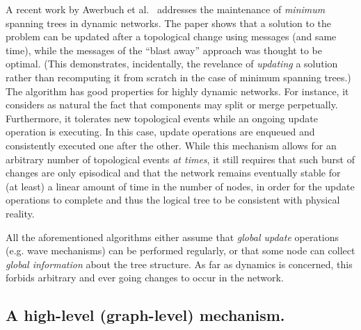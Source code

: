 \documentclass[twocolumn]{article}
\begin{document}
A recent work by Awerbuch et al.~\cite{Awerbuch08} addresses the maintenance of {\em minimum} spanning trees in dynamic networks. The paper shows that a solution to the problem can be updated after a topological change using  messages (and same time), while the  messages of the ``blast away'' approach was thought to be optimal. (This demonstrates, incidentally, the revelance of {\em updating} a solution rather than recomputing it from scratch in the case of minimum spanning trees.) The algorithm has good properties for highly dynamic networks. For instance, it considers as natural the fact that components may split or merge perpetually. Furthermore, it tolerates new topological events while an ongoing update operation is executing. In this case, update operations are enqueued and consistently executed one after the other. While this mechanism allows for an arbitrary number of topological events {\em at times}, it still requires that such burst of changes are only episodical and that the network remains eventually stable for (at least) a linear amount of time in the number of nodes, in order for the update operations to complete and thus the logical tree to be consistent with physical reality.

All the aforementioned algorithms either assume that {\em global update} operations (e.g. wave mechanisms) can be performed regularly, or that some node can collect {\em global information} about the tree structure. As far as dynamics is concerned, this forbids arbitrary and ever going changes to occur in the network. 
 



\subsection{A high-level (graph-level) mechanism.}
\label{sec:principle}
\end{document}

